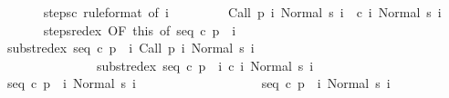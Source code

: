 \begin{isabellebody}
\ \ \ \ \ \ \isamarkupfalse%
\ steps{\isacharunderscore}c\ {\isacharbrackleft}rule{\isacharunderscore}format{\isacharcomma}\ of\ i{\isacharbrackright}\isanewline
\ \ \ \ \ \ \isamarkupfalse%
\ {\isachardoublequoteopen}{\isasymGamma}{\isasymturnstile}\ {\isacharparenleft}Call\ {\isacharparenleft}p\ i{\isacharparenright}{\isacharcomma}\ Normal\ {\isacharparenleft}s\ i{\isacharparenright}{\isacharparenright}\ {\isasymrightarrow}\isactrlsup {\isacharplus}\ {\isacharparenleft}c\ i{\isacharcomma}\ Normal\ {\isacharparenleft}s\ {\isacharparenleft}i\ {\isacharplus}\ {}{\isacharparenright}{\isacharparenright}{\isacharparenright}{\isachardoublequoteclose}\isacommand{{\isachardot}}\isamarkupfalse%
\isanewline
\ \ \ \ \ \ \isamarkupfalse%
\ steps{\isacharunderscore}redex{\isacharprime}\ {\isacharbrackleft}OF\ this{\isacharcomma}\ of\ {\isachardoublequoteopen}{\isacharparenleft}seq\ c\ {\isacharparenleft}p\ {}{\isacharparenright}\ i{\isacharparenright}{\isachardoublequoteclose}{\isacharbrackright}\isanewline
\ \ \ \ \ \ \isamarkupfalse%
\ {\isachardoublequoteopen}{\isasymGamma}{\isasymturnstile}\ {\isacharparenleft}subst{\isacharunderscore}redex\ {\isacharparenleft}seq\ c\ {\isacharparenleft}p\ {}{\isacharparenright}\ i{\isacharparenright}\ {\isacharparenleft}Call\ {\isacharparenleft}p\ i{\isacharparenright}{\isacharparenright}{\isacharcomma}\ Normal\ {\isacharparenleft}s\ i{\isacharparenright}{\isacharparenright}\ {\isasymrightarrow}\isactrlsup {\isacharplus}\isanewline
\ \ \ \ \ \ \ \ \ \ \ \ \ \ \ \ {\isacharparenleft}subst{\isacharunderscore}redex\ {\isacharparenleft}seq\ c\ {\isacharparenleft}p\ {}{\isacharparenright}\ i{\isacharparenright}\ {\isacharparenleft}c\ i{\isacharparenright}{\isacharcomma}\ Normal\ {\isacharparenleft}s\ {\isacharparenleft}i\ {\isacharplus}\ {}{\isacharparenright}{\isacharparenright}{\isacharparenright}{\isachardoublequoteclose}\ \isacommand{{\isachardot}}\isamarkupfalse%
\isanewline
\ \ \ \ \ \ \isamarkupfalse%
\ {\isachardoublequoteopen}{\isasymGamma}{\isasymturnstile}\ {\isacharparenleft}seq\ c\ {\isacharparenleft}p\ {}{\isacharparenright}\ i{\isacharcomma}\ Normal\ {\isacharparenleft}s\ i{\isacharparenright}{\isacharparenright}\ {\isasymrightarrow}\isactrlsup {\isacharplus}\ \isanewline
\ \ \ \ \ \ \ \ \ \ \ \ \ \ \ \ \ {\isacharparenleft}seq\ c\ {\isacharparenleft}p\ {}{\isacharparenright}\ {\isacharparenleft}i{\isacharplus}{}{\isacharparenright}{\isacharcomma}\ Normal\ {\isacharparenleft}s\ {\isacharparenleft}i\ {\isacharplus}\ {}{\isacharparenright}{\isacharparenright}{\isacharparenright}{\isachardoublequoteclose}\isanewline

\end{isabellebody}
